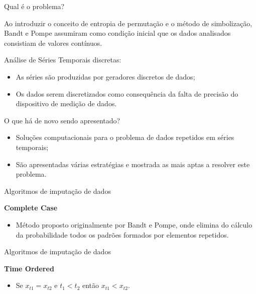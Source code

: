 \documentclass{beamer} %
\begin{document}
\begin{frame}{Qual é o problema?}

Ao introduzir o conceito de entropia de permutação e o método de simbolização, Bandt e Pompe assumiram como condição inicial que os dados analisados consistiam de valores contínuos.

\vspace{0.8cm}

Análise de Séries Temporais discretas:

\begin{itemize}
    \item As séries são produzidas por geradores discretos de dados;
    \item Os dados serem discretizados como consequência da falta de precisão do dispositivo de medição de dados.
\end{itemize}

\end{frame}

\begin{frame}{O que há de novo sendo apresentado?}

\begin{itemize}
    \item Soluções computacionais para o problema de dados repetidos em séries temporais;
    \vspace{0.5cm}
    \item São apresentadas várias estratégias e mostrada as mais aptas a resolver este problema.
\end{itemize}

\end{frame}

\begin{frame}{Algoritmos de imputação de dados}

\textbf{Complete Case}

\begin{itemize}
    \item Método proposto originalmente por Bandt e Pompe, onde elimina do cálculo da probabilidade todos os padrões formados por elementos repetidos. 
\end{itemize}


\end{frame}

\begin{frame}{Algoritmos de imputação de dados}

\textbf{Time Ordered}

\begin{itemize}
    \item Se $x_{t1} = x_{t2}$ e $t_{1} < t_{2}$ então $x_{t1} < x_{t2}$.
\end{itemize}


\end{frame}
\end{document}
